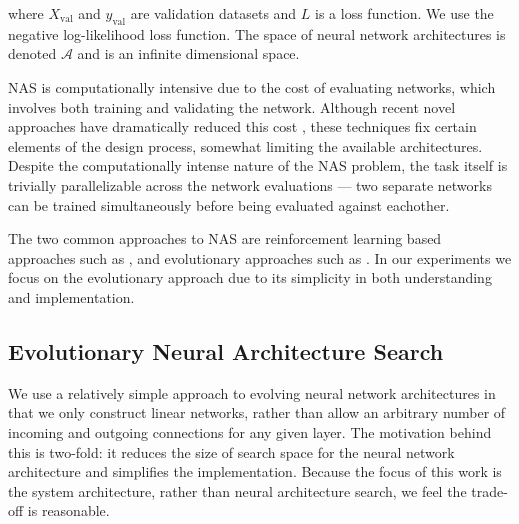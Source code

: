 \documentclass[conference]{IEEEtran}
\begin{document}
where $X_{\text{val}}$ and $y_{\text{val}}$ are validation datasets and $L$
is a loss function. We use the negative log-likelihood loss function. The
space of neural network architectures is denoted $\mathcal{A}$ and is an
infinite dimensional space.

NAS is computationally intensive due to the cost of evaluating networks, which
involves both training and validating the network.  Although recent novel
approaches have dramatically reduced this cost
\cite{DBLP:journals/corr/abs-1708-05344, pmlr-v80-pham18a}, these techniques fix
certain elements of the design process, somewhat limiting the available
architectures. Despite the computationally intense nature of the NAS problem,
the task itself is trivially parallelizable across the network evaluations ---
two separate networks can be trained simultaneously before being evaluated
against eachother.

The two common approaches to NAS are reinforcement learning based approaches such
as \cite{45826, Kyriakides:2018:NAS:3200947.3208068, pmlr-v80-pham18a}, and
evolutionary approaches such as \cite{DBLP:journals/corr/abs-1711-00436,
  DBLP:journals/corr/MiikkulainenLMR17, DBLP:conf/icml/RealMSSSTLK17}. In our
experiments we focus on the evolutionary approach due to its simplicity in both
understanding and implementation.

\subsection{Evolutionary Neural Architecture Search}
We use a relatively simple approach to evolving neural network architectures in
that we only construct linear networks, rather than allow an arbitrary number of
incoming and outgoing connections for any given layer. The motivation behind
this is two-fold: it reduces the size of search space for the neural network
architecture and simplifies the implementation. Because the focus of this work
is the system architecture, rather than neural architecture search, we feel the
trade-off is reasonable.
% 
\end{document}
